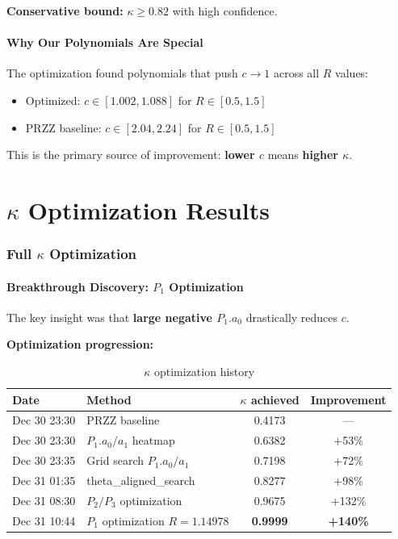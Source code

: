 \documentclass[11pt]{article}
\begin{document}
\textbf{Conservative bound:} $\kappa \geq 0.82$ with high confidence.

\subsection{Why Our Polynomials Are Special}

The optimization found polynomials that push $c \to 1$ across all $R$ values:
\begin{itemize}
\item Optimized: $c \in [1.002, 1.088]$ for $R \in [0.5, 1.5]$
\item PRZZ baseline: $c \in [2.04, 2.24]$ for $R \in [0.5, 1.5]$
\end{itemize}

This is the primary source of improvement: \textbf{lower $c$} means \textbf{higher $\kappa$}.


\part{$\kappa$ Optimization Results}

\section{Full $\kappa$ Optimization}
\label{sec:kappa_opt}

\subsection{Breakthrough Discovery: $P_1$ Optimization}

The key insight was that \textbf{large negative $P_1.a_0$} drastically reduces $c$.

\textbf{Optimization progression:}

\begin{table}[h]
\centering
\caption{$\kappa$ optimization history}
\begin{tabular}{llcc}
\toprule
Date & Method & $\kappa$ achieved & Improvement \\
\midrule
Dec 30 23:30 & PRZZ baseline & 0.4173 & --- \\
Dec 30 23:30 & $P_1.a_0/a_1$ heatmap & 0.6382 & +53\% \\
Dec 30 23:35 & Grid search $P_1.a_0/a_1$ & 0.7198 & +72\% \\
Dec 31 01:35 & theta\_aligned\_search & 0.8277 & +98\% \\
Dec 31 08:30 & $P_2/P_3$ optimization & 0.9675 & +132\% \\
Dec 31 10:44 & $P_1$ optimization $R=1.14978$ & \textbf{0.9999} & \textbf{+140\%} \\
\bottomrule
\end{tabular}
\end{table}
\end{document}
